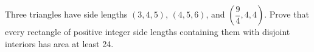 Three triangles have side lengths $(3,4,5)$, $(4,5,6)$, and $(\dfrac{9}{4},4,4)$. Prove that every rectangle of positive integer side lengths containing them with disjoint interiors has area at least 24.
